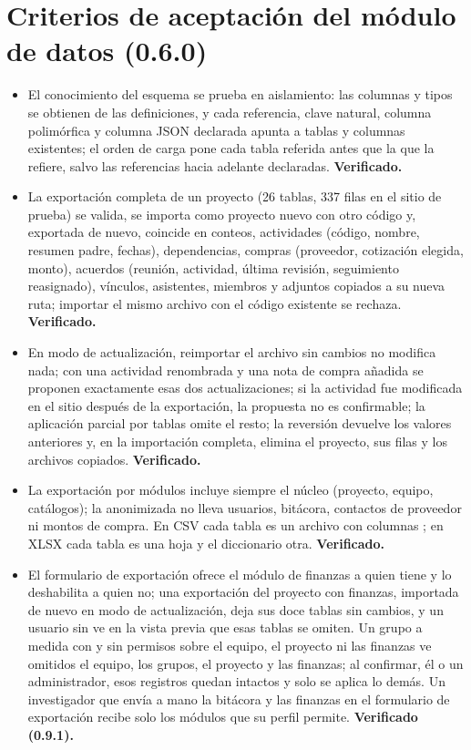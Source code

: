 \documentclass[11pt,a4paper]{article}
\begin{document}
\section{Criterios de aceptación del módulo de datos (0.6.0)}

\begin{itemize}
\item El conocimiento del esquema se prueba en aislamiento: las columnas y tipos se obtienen de las definiciones, y cada referencia, clave natural, columna polimórfica y columna JSON declarada apunta a tablas y columnas existentes; el orden de carga pone cada tabla referida antes que la que la refiere, salvo las referencias hacia adelante declaradas. \textbf{Verificado.}
\item La exportación completa de un proyecto (26 tablas, 337 filas en el sitio de prueba) se valida, se importa como proyecto nuevo con otro código y, exportada de nuevo, coincide en conteos, actividades (código, nombre, resumen padre, fechas), dependencias, compras (proveedor, cotización elegida, monto), acuerdos (reunión, actividad, última revisión, seguimiento reasignado), vínculos, asistentes, miembros y adjuntos copiados a su nueva ruta; importar el mismo archivo con el código existente se rechaza. \textbf{Verificado.}
\item En modo de actualización, reimportar el archivo sin cambios no modifica nada; con una actividad renombrada y una nota de compra añadida se proponen exactamente esas dos actualizaciones; si la actividad fue modificada en el sitio después de la exportación, la propuesta no es confirmable; la aplicación parcial por tablas omite el resto; la reversión devuelve los valores anteriores y, en la importación completa, elimina el proyecto, sus filas y los archivos copiados. \textbf{Verificado.}
\item La exportación por módulos incluye siempre el núcleo (proyecto, equipo, catálogos); la anonimizada no lleva usuarios, bitácora, contactos de proveedor ni montos de compra. En CSV cada tabla es un archivo con columnas ; en XLSX cada tabla es una hoja y el diccionario otra. \textbf{Verificado.}
\item El formulario de exportación ofrece el módulo de finanzas a quien tiene  y lo deshabilita a quien no; una exportación del proyecto con finanzas, importada de nuevo en modo de actualización, deja sus doce tablas sin cambios, y un usuario sin  ve en la vista previa que esas tablas se omiten. Un grupo a medida con  y sin permisos sobre el equipo, el proyecto ni las finanzas ve omitidos el equipo, los grupos, el proyecto y las finanzas; al confirmar, él o un administrador, esos registros quedan intactos y solo se aplica lo demás. Un investigador que envía a mano la bitácora y las finanzas en el formulario de exportación recibe solo los módulos que su perfil permite. \textbf{Verificado (0.9.1).}

\end{itemize}
\end{document}
